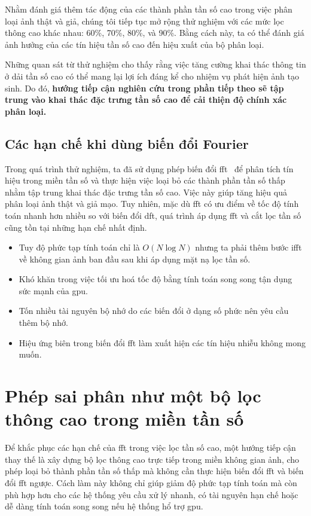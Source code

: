 Nhằm đánh giá thêm tác động của các thành phần tần số cao trong việc phân loại ảnh thật và giả, chúng tôi tiếp tục mở rộng thử nghiệm với các mức lọc thông cao khác nhau: 60\%, 70\%, 80\%, và 90\%. Bằng cách này, ta có thể đánh giá ảnh hưởng của các tín hiệu tần số cao đến hiệu xuất của bộ phân loại.

Những quan sát từ thử nghiệm cho thấy rằng việc tăng cường khai thác thông tin ở dải tần số cao có thể mang lại lợi ích đáng kể cho nhiệm vụ phát hiện ảnh tạo sinh. Do đó, \textbf{hướng tiếp cận nghiên cứu trong phần tiếp theo sẽ tập trung vào khai thác đặc trưng tần số cao để cải thiện độ chính xác phân loại.}

\subsection{Các hạn chế khi dùng biến đổi Fourier}

Trong quá trình thử nghiệm, ta đã sử dụng phép biến đổi \gls{fft}~\cite{Arunachalam2013TheFF} để phân tích tín hiệu trong miền tần số và thực hiện việc loại bỏ các thành phần tần số thấp nhằm tập trung khai thác đặc trưng tần số cao. Việc này giúp tăng hiệu quả phân loại ảnh thật và giả mạo. Tuy nhiên, mặc dù \gls{fft} có ưu điểm về tốc độ tính toán nhanh hơn nhiều so với biến đổi \gls{dft}, quá trình áp dụng \gls{fft} và cắt lọc tần số cũng tồn tại những hạn chế nhất định.

\begin{itemize}
	\item Tuy độ phức tạp tính toán chỉ là $O(N\log{N})$ nhưng ta phải thêm bước \gls{ifft} về không gian ảnh ban đầu sau khi áp dụng mặt nạ lọc tần số.
	\item Khó khăn trong việc tối ưu hoá tốc độ bằng tính toán song song tận dụng sức mạnh của \gls{gpu}.
	\item Tốn nhiều tài nguyên bộ nhớ do các biến đổi ở dạng số phức nên yêu cầu thêm bộ nhớ.
	\item Hiệu ứng biên trong biến đổi \gls{fft} làm xuất hiện các tín hiệu nhiễu không mong muốn.
\end{itemize}

\section{Phép sai phân như một bộ lọc thông cao trong miền tần số}

Để khắc phục các hạn chế của \gls{fft} trong việc lọc tần số cao, một hướng tiếp cận thay thế là xây dựng bộ lọc thông cao trực tiếp trong miền không gian ảnh, cho phép loại bỏ thành phần tần số thấp mà không cần thực hiện biến đổi \gls{fft} và biến đổi \gls{fft} ngược.
%
Cách làm này không chỉ giúp giảm độ phức tạp tính toán mà còn phù hợp hơn cho các hệ thống yêu cầu xử lý nhanh, có tài nguyên hạn chế hoặc dễ dàng tính toán song song nếu hệ thống hổ trợ \gls{gpu}.

